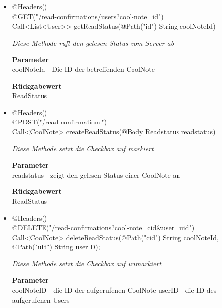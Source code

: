             \begin{itemize}
        		\item{@Headers()\\@GET("/read-confirmations/users?cool-note={id}") \\ Call<List<User>> getReadStatus(@Path("id") String coolNoteId)}
        	
        		\textit{Diese Methode ruft den gelesen Status vom Server ab}
        	
        		\textbf{Parameter} \\
                 coolNoteId - Die ID der betreffenden CoolNote
        		        	
       		 	\textbf{Rückgabewert} \\
                ReadStatus
      		  	 
      	     	\item{@Headers()\\ @POST("/read-confirmations") \\ Call<CoolNote> createReadStatus(@Body Readstatus readstatus) } 
        	
        		\textit{Diese Methode setzt die Checkbox auf markiert}
        	
        		\textbf{Parameter} \\
                 readstatus - zeigt den gelesen Status einer CoolNote an
        		        	
       		 	\textbf{Rückgabewert} \\
                ReadStatus
        	
       		 
            	  	 
      	     	\item{@Headers()\\ @DELETE("/read-confirmations?cool-note={cid}\&user={uid}")}
 \\Call<CoolNote> deleteReadStatus(@Path("cid") String coolNoteId,
                                     @Path("uid") String userID);
        	
        		\textit{Diese Methode setzt die Checkbox auf unmarkiert}
        	
        		\textbf{Parameter} \\
                coolNoteID - die ID der aufgerufenen CoolNote
                userID - die ID des aufgerufenen Users
        		        	
              
        	
       		 \end{itemize}
            
